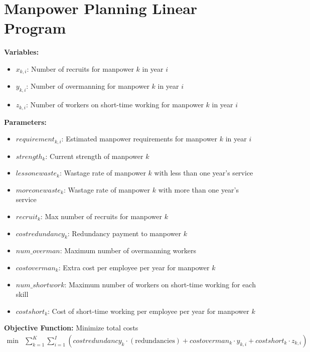 \documentclass{article}
\begin{document}
\section*{Manpower Planning Linear Program}

\textbf{Variables:}
\begin{itemize}
    \item \( x_{k,i} \): Number of recruits for manpower \( k \) in year \( i \)
    \item \( y_{k,i} \): Number of overmanning for manpower \( k \) in year \( i \)
    \item \( z_{k,i} \): Number of workers on short-time working for manpower \( k \) in year \( i \)
\end{itemize}

\textbf{Parameters:}
\begin{itemize}
    \item \( requirement_{k,i} \): Estimated manpower requirements for manpower \( k \) in year \( i \)
    \item \( strength_k \): Current strength of manpower \( k \)
    \item \( lessonewaste_k \): Wastage rate of manpower \( k \) with less than one year's service
    \item \( moreonewaste_k \): Wastage rate of manpower \( k \) with more than one year's service
    \item \( recruit_k \): Max number of recruits for manpower \( k \)
    \item \( costredundancy_k \): Redundancy payment to manpower \( k \)
    \item \( num\_overman \): Maximum number of overmanning workers
    \item \( costoverman_k \): Extra cost per employee per year for manpower \( k \)
    \item \( num\_shortwork \): Maximum number of workers on short-time working for each skill
    \item \( costshort_k \): Cost of short-time working per employee per year for manpower \( k \)
\end{itemize}

\textbf{Objective Function:} 
Minimize total costs
\[
\begin{align*}
\min & \sum_{k=1}^{K} \sum_{i=1}^{I} \left( costredundancy_k \cdot (\text{redundancies}) + costoverman_k \cdot y_{k,i} + costshort_k \cdot z_{k,i} \right)
\end{align*}
\]
\end{document}
